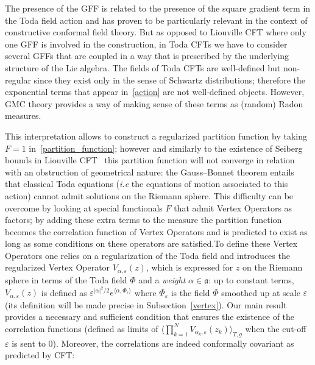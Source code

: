 \documentclass[10pt]{amsart}
\theoremstyle{definition}\newtheorem{defi}[theo]{Definition}\newtheorem{rema}[theo]{Remark}\newtheorem{exam}[theo]{Example}\newtheorem{exem}[theo]{Example}\newtheorem{nota}[theo]{Notation}
\newcommand{\frka}{\mathfrak{a}}
\newcommand*\eps{\varepsilon}
\newcommand*\green[1]{#1}
\begin{document}
The presence of the GFF is related to the presence of the square gradient term in the Toda field action and has proven to be particularly relevant in the context of constructive conformal field theory. But as opposed to Liouville CFT where only one GFF is involved in the construction, in Toda CFTs we have to consider several GFFs that are coupled in a way that is prescribed by the underlying structure of the Lie algebra. The fields of Toda CFTs are well-defined but non-regular since they exist only in the sense of Schwartz distributions; therefore the exponential terms that appear in~\eqref{action} are not well-defined objects. However, GMC theory provides a way of making sense of these terms as (random) Radon measures.

This interpretation allows to construct a regularized partition function by taking ${F=1}$ in~\eqref{partition_function}; however and similarly to the existence of Seiberg bounds in Liouville CFT~\cite{Sei90} this partition function will not converge in relation with an obstruction of geometrical nature: the Gauss--Bonnet theorem entails that classical Toda equations (\emph{i.e} the equations of motion associated to this action) cannot admit solutions on the Riemann sphere. This difficulty can be overcome by looking at special functionals $F$ that admit Vertex Operators as factors; by adding these extra terms to the measure the partition function becomes the correlation function of Vertex Operators and is predicted to exist as long as some conditions on these operators are satisfied.\linebreak To define these Vertex Operators one relies on a regularization of the Toda field and introduces the regularized Vertex Operator $V_{\alpha,\eps}(z)$, which is expressed for $z$ on the Riemann sphere in terms of the Toda field $\green\Phi$ and a \emph{weight} $\alpha\in\frka$: up to constant terms, $V_{\alpha,\eps}(z)$ is defined as $\eps^{|\alpha|^2/2}e^{\langle \alpha, \green\Phi_\eps \rangle}$ where $\green\Phi_\eps$ is the field $\green\Phi$ smoothed up at scale $\eps$ (its definition will be made precise in Subsection~\ref{vertex}). Our main result provides a necessary and sufficient condition that ensures the existence of the correlation functions (defined as limits of $\langle \prod_{k=1}^NV_{\alpha_k,\eps}(z_k)\rangle_{T,g} $ when the cut-off $\eps$ is sent to $0$). Moreover, the correlations are indeed conformally covariant as predicted by CFT:
\end{document}
